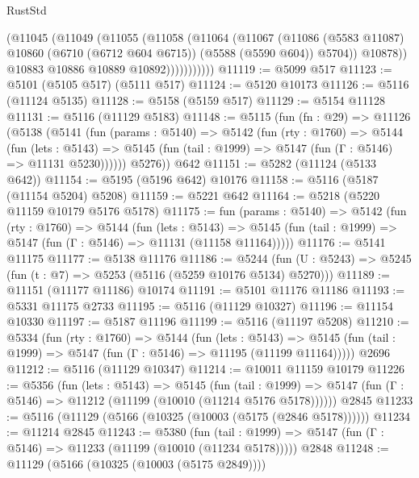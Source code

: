 \begin{lexlean}{RustStd}
\begin{coremodule}
                    (@11045
                      (@11049
                        (@11055
                          (@11058
                            (@11064
                              (@11067
                                (@11086
                                  (@5583 @11087)
                                  @10860
                                  (@6710 (@6712 @604 @6715))
                                  (@5588 (@5590 @604))
                                  @5704))
                              @10878))
                          @10883
                          @10886
                          @10889
                          @10892)))))))))))
@11119 := @5099 @517
@11123 := @5101 (@5105 @517) (@5111 @517)
@11124 := @5120 @10173
@11126 := @5116 (@11124 @5135)
@11128 := @5158 (@5159 @517)
@11129 := @5154 @11128
@11131 := @5116 (@11129 @5183)
@11148 := @5115
    (fun (fn : @29) =>
    @11126
      (@5138
        (@5141
          (fun (params : @5140) =>
          @5142
            (fun (rty : @1760) =>
            @5144
              (fun (lets : @5143) =>
              @5145 (fun (tail : @1999) => @5147 (fun (Γ : @5146) => @11131 @5230))))))
        @5276))
    @642
@11151 := @5282 (@11124 (@5133 @642))
@11154 := @5195 (@5196 @642) @10176
@11158 := @5116 (@5187 (@11154 @5204) @5208)
@11159 := @5221 @642
@11164 := @5218 (@5220 @11159 @10179 @5176 @5178)
@11175 := fun (params : @5140) =>
  @5142
    (fun (rty : @1760) =>
    @5144
      (fun (lets : @5143) =>
      @5145 (fun (tail : @1999) => @5147 (fun (Γ : @5146) => @11131 (@11158 @11164)))))
@11176 := @5141 @11175
@11177 := @5138 @11176
@11186 := @5244
    (fun (U : @5243) => @5245 (fun (t : @7) => @5253 (@5116 (@5259 @10176 @5134) @5270)))
@11189 := @11151 (@11177 @11186) @10174
@11191 := @5101 @11176 @11186
@11193 := @5331 @11175 @2733
@11195 := @5116 (@11129 @10327)
@11196 := @11154 @10330
@11197 := @5187 @11196
@11199 := @5116 (@11197 @5208)
@11210 := @5334
    (fun (rty : @1760) =>
    @5144
      (fun (lets : @5143) =>
      @5145 (fun (tail : @1999) => @5147 (fun (Γ : @5146) => @11195 (@11199 @11164)))))
    @2696
@11212 := @5116 (@11129 @10347)
@11214 := @10011 @11159 @10179
@11226 := @5356
    (fun (lets : @5143) =>
    @5145
      (fun (tail : @1999) =>
      @5147 (fun (Γ : @5146) => @11212 (@11199 (@10010 (@11214 @5176 @5178))))))
    @2845
@11233 := @5116 (@11129 (@5166 (@10325 (@10003 (@5175 (@2846 @5178))))))
@11234 := @11214 @2845
@11243 := @5380
    (fun (tail : @1999) => @5147 (fun (Γ : @5146) => @11233 (@11199 (@10010 (@11234 @5178)))))
    @2848
@11248 := @11129 (@5166 (@10325 (@10003 (@5175 @2849))))

\end{coremodule}
\end{lexlean}
